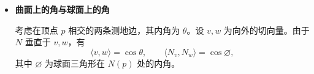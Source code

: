 \begin{itemize}
  在抛物面片 $z=\frac12(x^2+y^2)$ 上，所选测地边是一条子午线，因而确是测地线。其高斯映射为
  \[
    N(p)=\frac{(-x,-y,1)}{\sqrt{x^2+y^2+1}}.
  \]
  考虑竖直平面 $y=0$。这个平面与单位球面（浅青色）相交成一个大圆。因此，高斯映射将该测地边映为大圆的一段弧，用来说明“$T$ 的每条测地边在 $N$ 下都映为大圆弧”。由此，原书得出 $N(T)$ 是以大圆弧为边的球面三角形。
  \item \textbf{曲面上的角与球面上的角}

  考虑在顶点 $p$ 相交的两条测地边，其内角为 $\theta$。设 $v,w$ 为向外的切向量。由于 $N$ 垂直于 $v,w$，有
  \[
    \langle v,w\rangle=\cos\theta,\qquad
    \langle N_v,N_w\rangle=\cos\varnothing,
  \]
  其中 $\varnothing$ 为球面三角形在 $N(p)$ 处的内角。
\end{itemize}
